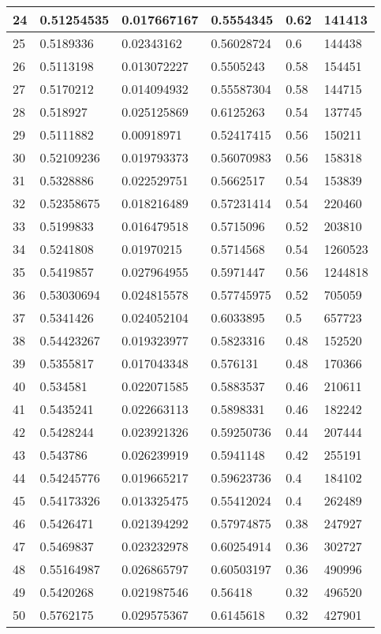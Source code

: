 \begin{longtable}{|l|l|l|l|l|l|}
24 & 0.51254535 & 0.017667167 & 0.5554345 & 0.62 & 141413 \\ \hline 
25 & 0.5189336 & 0.02343162 & 0.56028724 & 0.6 & 144438 \\ \hline 
26 & 0.5113198 & 0.013072227 & 0.5505243 & 0.58 & 154451 \\ \hline 
27 & 0.5170212 & 0.014094932 & 0.55587304 & 0.58 & 144715 \\ \hline 
28 & 0.518927 & 0.025125869 & 0.6125263 & 0.54 & 137745 \\ \hline 
29 & 0.5111882 & 0.00918971 & 0.52417415 & 0.56 & 150211 \\ \hline 
30 & 0.52109236 & 0.019793373 & 0.56070983 & 0.56 & 158318 \\ \hline 
31 & 0.5328886 & 0.022529751 & 0.5662517 & 0.54 & 153839 \\ \hline 
32 & 0.52358675 & 0.018216489 & 0.57231414 & 0.54 & 220460 \\ \hline 
33 & 0.5199833 & 0.016479518 & 0.5715096 & 0.52 & 203810 \\ \hline 
34 & 0.5241808 & 0.01970215 & 0.5714568 & 0.54 & 1260523 \\ \hline 
35 & 0.5419857 & 0.027964955 & 0.5971447 & 0.56 & 1244818 \\ \hline 
36 & 0.53030694 & 0.024815578 & 0.57745975 & 0.52 & 705059 \\ \hline 
37 & 0.5341426 & 0.024052104 & 0.6033895 & 0.5 & 657723 \\ \hline 
38 & 0.54423267 & 0.019323977 & 0.5823316 & 0.48 & 152520 \\ \hline 
39 & 0.5355817 & 0.017043348 & 0.576131 & 0.48 & 170366 \\ \hline 
40 & 0.534581 & 0.022071585 & 0.5883537 & 0.46 & 210611 \\ \hline 
41 & 0.5435241 & 0.022663113 & 0.5898331 & 0.46 & 182242 \\ \hline 
42 & 0.5428244 & 0.023921326 & 0.59250736 & 0.44 & 207444 \\ \hline 
43 & 0.543786 & 0.026239919 & 0.5941148 & 0.42 & 255191 \\ \hline 
44 & 0.54245776 & 0.019665217 & 0.59623736 & 0.4 & 184102 \\ \hline 
45 & 0.54173326 & 0.013325475 & 0.55412024 & 0.4 & 262489 \\ \hline 
46 & 0.5426471 & 0.021394292 & 0.57974875 & 0.38 & 247927 \\ \hline 
47 & 0.5469837 & 0.023232978 & 0.60254914 & 0.36 & 302727 \\ \hline 
48 & 0.55164987 & 0.026865797 & 0.60503197 & 0.36 & 490996 \\ \hline 
49 & 0.5420268 & 0.021987546 & 0.56418 & 0.32 & 496520 \\ \hline 
50 & 0.5762175 & 0.029575367 & 0.6145618 & 0.32 & 427901 \\ \hline 
\end{longtable}